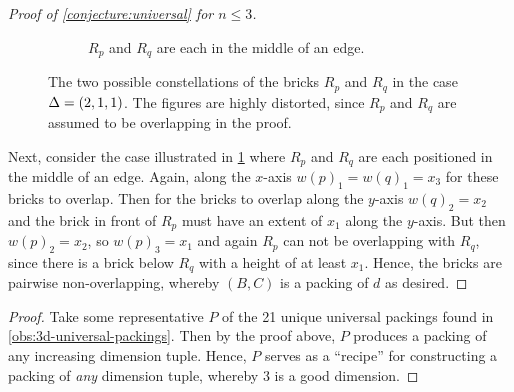 \begin{proof}[Proof of \cref{conjecture:universal} for $n \leq 3$]
\begin{figure}[ht]
\begin{subfigure}[b]{0.47\textwidth}
        \caption{$R_p$ and $R_q$ are each in the middle of an edge.}
        \label{fig:conj-n3-edge}
    \end{subfigure}
    \caption{The two possible constellations of the bricks $R_p$ and $R_q$ in the case $\Delta = \left( 2, 1, 1 \right)$. The figures are highly distorted, since $R_p$ and $R_q$ are assumed to be overlapping in the proof.}
    \label{fig:conj-n3}
\end{figure}

Next, consider the case illustrated in \cref{fig:conj-n3-edge} where $R_p$ and $R_q$ are each positioned in the middle of an edge. Again, along the $x$-axis $w(p)_1 = w(q)_1 = x_3$ for these bricks to overlap. Then for the bricks to overlap along the $y$-axis $w(q)_2 = x_2$ and the brick in front of $R_p$ must have an extent of $x_1$ along the $y$-axis. But then $w(p)_2 = x_2$, so $w(p)_3 = x_1$ and again $R_p$ can not be overlapping with $R_q$, since there is a brick below $R_q$ with a height of at least $x_1$. Hence, the bricks are pairwise non-overlapping, whereby $(B, C)$ is a packing of $d$ as desired.
\end{proof}


\begin{proof}
Take some representative $P$ of the 21 unique universal packings found in \cref{obs:3d-universal-packings}. Then by the proof above, $P$ produces a packing of any increasing dimension tuple. Hence, $P$ serves as a ``recipe'' for constructing a packing of \textit{any} dimension tuple, whereby $3$ is a good dimension.
\end{proof}
